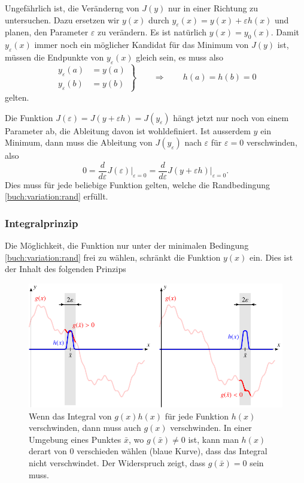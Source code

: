 Ungefährlich ist, die Veränderng von $J(y)$ nur in einer Richtung 
zu untersuchen.
Dazu ersetzen wir $y(x)$ durch $y_{\varepsilon}(x)=y(x)+\varepsilon h(x)$
und planen, den Parameter $\varepsilon$ zu verändern.
Es ist natürlich $y(x)=y_0(x)$.
Damit $y_{\varepsilon}(x)$ immer noch ein möglicher Kandidat für das Minimum
von $J(y)$ ist, müssen die Endpunkte von $y_{\varepsilon}(x)$ gleich sein,
es muss also
\begin{equation}
\left.
\begin{aligned}
y_{\varepsilon}(a)&=y(a) \\
y_{\varepsilon}(b)&=y(b) 
\end{aligned}
\right\}
\qquad\Rightarrow\qquad
h(a)=h(b)=0
\label{buch:variation:rand}
\end{equation}
gelten.

Die Funktion $J(\varepsilon) = J(y+\varepsilon h) = J(y_{\varepsilon})$
hängt jetzt nur noch von einem Parameter ab, die Ableitung davon ist
wohldefiniert.
Ist ausserdem $y$ ein Minimum, dann muss die Ableitung von
$J(y_{\varepsilon})$ nach $\varepsilon$ für $\varepsilon=0$
verschwinden, also
\[
0
=
\frac{d}{d\varepsilon} J(\varepsilon)\bigg|_{\varepsilon=0}
=
\frac{d}{d\varepsilon} J(y+\varepsilon h)\bigg|_{\varepsilon=0}.
\]
Dies muss für jede beliebige Funktion gelten, welche die Randbedingung
\eqref{buch:variation:rand} erfüllt.

\subsubsection{Integralprinzip}
Die Möglichkeit, die Funktion nur unter der minimalen Bedingung
\eqref{buch:variation:rand} frei zu wählen, schränkt die Funktion
$y(x)$ ein.
Dies ist der Inhalt des folgenden Prinzips
\begin{figure}
\centering
\includegraphics{chapters/30-interpolation/figures/integral.pdf}
\caption{Wenn das Integral von $g(x) h(x)$ für jede Funktion $h(x)$
verschwinden, dann muss auch $g(x)$ verschwinden.
In einer Umgebung eines Punktes $\bar{x}$, wo $g(\bar{x})\ne 0$ ist,
kann man $h(x)$ derart von $0$ verschieden wählen (blaue Kurve),
dass das Integral nicht verschwindet.
Der Widerspruch zeigt, dass $g(\bar{x})=0$ sein muss.
\label{buch:interpolation:figure:integralprinzip}}
\end{figure}

